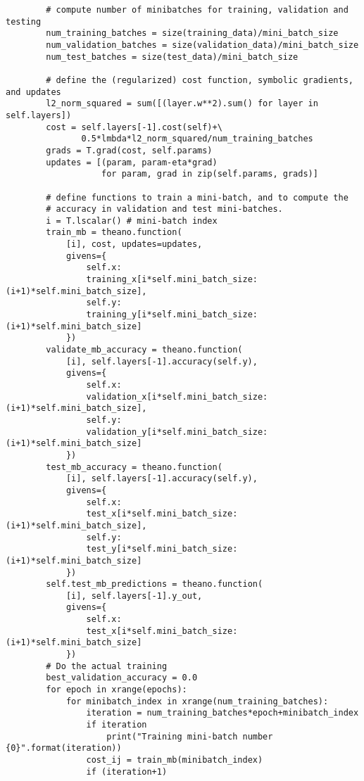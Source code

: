 \begin{lstlisting}
        # compute number of minibatches for training, validation and testing
        num_training_batches = size(training_data)/mini_batch_size
        num_validation_batches = size(validation_data)/mini_batch_size
        num_test_batches = size(test_data)/mini_batch_size

        # define the (regularized) cost function, symbolic gradients, and updates
        l2_norm_squared = sum([(layer.w**2).sum() for layer in self.layers])
        cost = self.layers[-1].cost(self)+\
               0.5*lmbda*l2_norm_squared/num_training_batches
        grads = T.grad(cost, self.params)
        updates = [(param, param-eta*grad) 
                   for param, grad in zip(self.params, grads)]

        # define functions to train a mini-batch, and to compute the
        # accuracy in validation and test mini-batches.
        i = T.lscalar() # mini-batch index
        train_mb = theano.function(
            [i], cost, updates=updates,
            givens={
                self.x:
                training_x[i*self.mini_batch_size: (i+1)*self.mini_batch_size],
                self.y: 
                training_y[i*self.mini_batch_size: (i+1)*self.mini_batch_size]
            })
        validate_mb_accuracy = theano.function(
            [i], self.layers[-1].accuracy(self.y),
            givens={
                self.x: 
                validation_x[i*self.mini_batch_size: (i+1)*self.mini_batch_size],
                self.y: 
                validation_y[i*self.mini_batch_size: (i+1)*self.mini_batch_size]
            })
        test_mb_accuracy = theano.function(
            [i], self.layers[-1].accuracy(self.y),
            givens={
                self.x: 
                test_x[i*self.mini_batch_size: (i+1)*self.mini_batch_size],
                self.y: 
                test_y[i*self.mini_batch_size: (i+1)*self.mini_batch_size]
            })
        self.test_mb_predictions = theano.function(
            [i], self.layers[-1].y_out,
            givens={
                self.x: 
                test_x[i*self.mini_batch_size: (i+1)*self.mini_batch_size]
            })
        # Do the actual training
        best_validation_accuracy = 0.0
        for epoch in xrange(epochs):
            for minibatch_index in xrange(num_training_batches):
                iteration = num_training_batches*epoch+minibatch_index
                if iteration 
                    print("Training mini-batch number {0}".format(iteration))
                cost_ij = train_mb(minibatch_index)
                if (iteration+1) 

\end{lstlisting}

